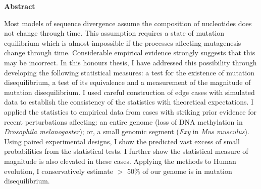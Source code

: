 \thispagestyle{plain}
\begin{center}
    \large
    \textbf{Abstract}
    
    Most models of sequence divergence assume the composition of nucleotides does not change through time. This assumption requires a state of mutation equilibrium which is almost impossible if the processes affecting mutagenesis change through time. Considerable empirical evidence strongly suggests that this may be incorrect. In this honours thesis, I have addressed this possibility through developing the following statistical measures: a test for the existence of mutation disequilibrium, a test of its equivalence and a measurement of the magnitude of mutation disequilibrium. I used careful construction of edge cases with simulated data to establish the consistency of the statistics with theoretical expectations. I applied the statistics to empirical data from cases with striking prior evidence for recent perturbations affecting: an entire genome (loss of DNA methylation in \textit{Drosophila melanogaster}); or, a small genomic segment (\textit{Fxy} in \textit{Mus musculus}). Using paired experimental designs, I show the predicted vast excess of small probabilities from the statistical tests. I further show the statistical measure of magnitude is also elevated in these cases. Applying the methods to Human evolution, I conservatively estimate $>$ 50\% of our genome is in mutation disequilibrium.


\end{center}